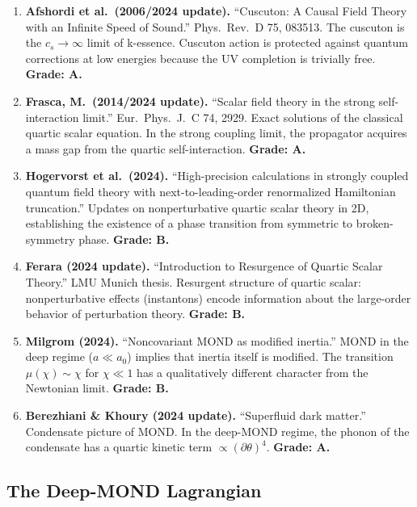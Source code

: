 \documentclass[11pt,a4paper]{article}
\begin{document}
\begin{enumerate}
\item \textbf{Afshordi et al.\ (2006/2024 update).} ``Cuscuton: A Causal Field Theory with an Infinite Speed of Sound.'' Phys.\ Rev.\ D 75, 083513. The cuscuton is the $c_s \to \infty$ limit of k-essence. Cuscuton action is protected against quantum corrections at low energies because the UV completion is trivially free. \textbf{Grade: A.}

\item \textbf{Frasca, M.\ (2014/2024 update).} ``Scalar field theory in the strong self-interaction limit.'' Eur.\ Phys.\ J.\ C 74, 2929. Exact solutions of the classical quartic scalar equation. In the strong coupling limit, the propagator acquires a mass gap from the quartic self-interaction. \textbf{Grade: A.}

\item \textbf{Hogervorst et al.\ (2024).} ``High-precision calculations in strongly coupled quantum field theory with next-to-leading-order renormalized Hamiltonian truncation.'' Updates on nonperturbative quartic scalar theory in 2D, establishing the existence of a phase transition from symmetric to broken-symmetry phase. \textbf{Grade: B.}

\item \textbf{Ferara (2024 update).} ``Introduction to Resurgence of Quartic Scalar Theory.'' LMU Munich thesis. Resurgent structure of quartic scalar: nonperturbative effects (instantons) encode information about the large-order behavior of perturbation theory. \textbf{Grade: B.}

\item \textbf{Milgrom (2024).} ``Noncovariant MOND as modified inertia.'' MOND in the deep regime ($a \ll a_0$) implies that inertia itself is modified. The transition $\mu(\chi) \sim \chi$ for $\chi \ll 1$ has a qualitatively different character from the Newtonian limit. \textbf{Grade: B.}

\item \textbf{Berezhiani \& Khoury (2024 update).} ``Superfluid dark matter.'' Condensate picture of MOND. In the deep-MOND regime, the phonon of the condensate has a quartic kinetic term $\propto (\partial\theta)^4$. \textbf{Grade: A.}
\end{enumerate}

\subsection{The Deep-MOND Lagrangian}
\end{document}
